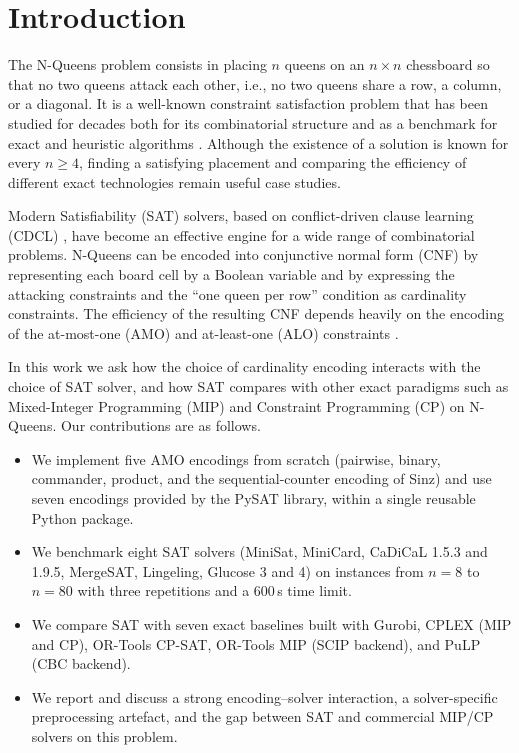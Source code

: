 \documentclass[a4paper,fleqn]{cas-sc}
\begin{document}
\section{Introduction}\label{sec:intro}
The N-Queens problem consists in placing $n$ queens on an $n\times n$ chessboard
so that no two queens attack each other, i.e., no two queens share a row, a
column, or a diagonal. It is a well-known constraint satisfaction problem that
has been studied for decades both for its combinatorial structure and as a
benchmark for exact and heuristic algorithms \citep{BellStevens2009}. Although
the existence of a solution is known for every $n \geq 4$, finding a
satisfying placement and comparing the efficiency of different exact technologies
remain useful case studies.

Modern Satisfiability (SAT) solvers, based on conflict-driven clause learning
(CDCL) \citep{MarquesSilva1999}, have become an effective engine for a wide range
of combinatorial problems. N-Queens can be encoded into conjunctive normal form
(CNF) by representing each board cell by a Boolean variable and by expressing the
attacking constraints and the ``one queen per row'' condition as cardinality
constraints. The efficiency of the resulting CNF depends heavily on the encoding
of the at-most-one (AMO) and at-least-one (ALO) constraints
\citep{Sinz2005,Prestwich2009,KlieberKwon2007}.

In this work we ask how the choice of cardinality encoding interacts with the
choice of SAT solver, and how SAT compares with other exact paradigms such as
Mixed-Integer Programming (MIP) and Constraint Programming (CP) on N-Queens.
Our contributions are as follows.
\begin{itemize}
  \item We implement five AMO encodings from scratch (pairwise, binary,
        commander, product, and the sequential-counter encoding of Sinz) and use
        seven encodings provided by the PySAT library, within a single reusable
        Python package.
  \item We benchmark eight SAT solvers (MiniSat, MiniCard, CaDiCaL 1.5.3 and
        1.9.5, MergeSAT, Lingeling, Glucose 3 and 4) on instances from $n=8$ to
        $n=80$ with three repetitions and a 600\,s time limit.
  \item We compare SAT with seven exact baselines built with Gurobi, CPLEX (MIP
        and CP), OR-Tools CP-SAT, OR-Tools MIP (SCIP backend), and PuLP (CBC
        backend).
  \item We report and discuss a strong encoding--solver interaction, a
        solver-specific preprocessing artefact, and the gap between SAT and
        commercial MIP/CP solvers on this problem.
\end{itemize}
\end{document}
